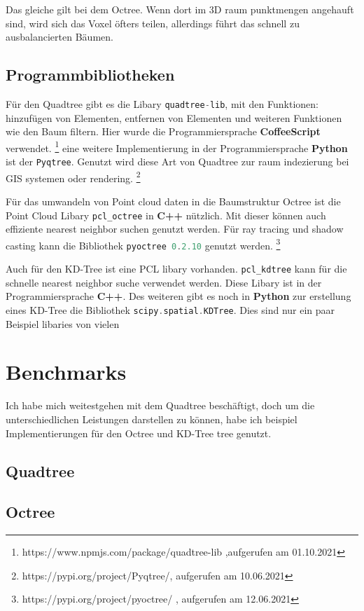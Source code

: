 \documentclass[11pt]{article}
\newcommand{\qt}{Quadtree }
\newcommand{\oc}{Octree }
\newcommand{\kd}{KD-Tree }
\newcommand{\fett}[1]{{\bf #1}}
\newcommand{\lstin}[1]{\lstinline[language=C]{#1}}
\begin{document}
Das gleiche gilt bei dem Octree. Wenn dort im 3D raum punktmengen angehauft sind, wird sich das Voxel öfters teilen, allerdings führt das schnell zu ausbalancierten Bäumen. 

\subsection{Programmbibliotheken}
 
Für den \qt gibt es die Libary \lstin{quadtree-lib}, mit den Funktionen: hinzufügen von Elementen, entfernen von Elementen und weiteren Funktionen wie den Baum filtern. Hier wurde die Programmiersprache \fett{CoffeeScript} verwendet. \footnote{https://www.npmjs.com/package/quadtree-lib ,aufgerufen am 01.10.2021}
eine weitere Implementierung in der Programmiersprache \fett{Python} ist der \lstin{Pyqtree}. Genutzt wird diese Art von \qt zur raum indezierung bei GIS systemen oder rendering. \footnote{https://pypi.org/project/Pyqtree/, aufgerufen am 10.06.2021}


Für das umwandeln von Point cloud daten in die Baumstruktur \oc ist die Point Cloud Libary \lstin{pcl_octree} in \fett{C++} nützlich. Mit dieser können auch effiziente nearest neighbor suchen genutzt werden. Für ray tracing und shadow casting kann die Bibliothek \lstin{pyoctree 0.2.10} genutzt werden. \footnote{https://pypi.org/project/pyoctree/ , aufgerufen am 12.06.2021}

Auch für den \kd ist eine PCL libary vorhanden. \lstin{pcl_kdtree} kann für die schnelle nearest neighbor suche verwendet werden. Diese Libary ist in der Programmiersprache \fett{C++}.
Des weiteren gibt es noch in \fett{Python} zur erstellung eines \kd die Bibliothek \lstin{scipy.spatial.KDTree}. \newline
Dies sind nur ein paar Beispiel libaries von vielen


\section{Benchmarks}
Ich habe mich weitestgehen mit dem \qt beschäftigt, doch um die unterschiedlichen Leistungen darstellen zu können, habe ich beispiel Implementierungen für den \oc und \kd tree genutzt. 


\subsection{\qt}



\subsection{\oc}
\end{document}
